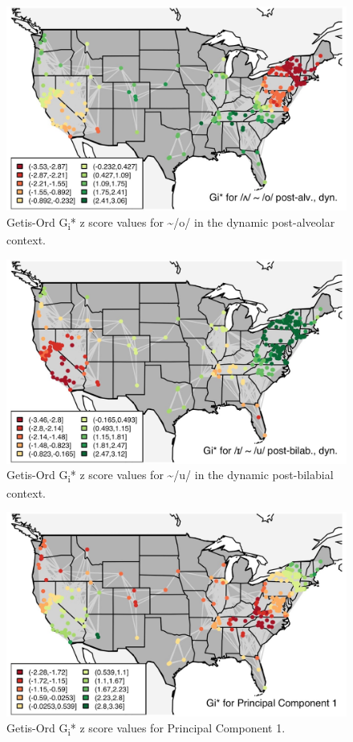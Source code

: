 \documentclass[output=paper]{LSP/langsci}
\begin{document}
\begin{figure}
\includegraphics[width=\textwidth]{illustrations/kend_frid_fig4}
\caption{Getis-Ord G\textsubscript{i}* z score values for 
\~{}/o/ in the dynamic post-alveolar context.}
\label{fig:4}
\end{figure}

\begin{figure}
\includegraphics[width=\textwidth]{illustrations/kend_frid_fig5}
\caption{Getis-Ord G\textsubscript{i}* z score values for 
\~{}/u/ in the dynamic post-bilabial context.}
\label{fig:5}
\end{figure}

\begin{figure}
\includegraphics[width=\textwidth]{illustrations/kend_frid_fig6}
\caption{Getis-Ord G\textsubscript{i}* z score values for Principal Component 1.}
\label{fig:6}
\end{figure}
\end{document}
